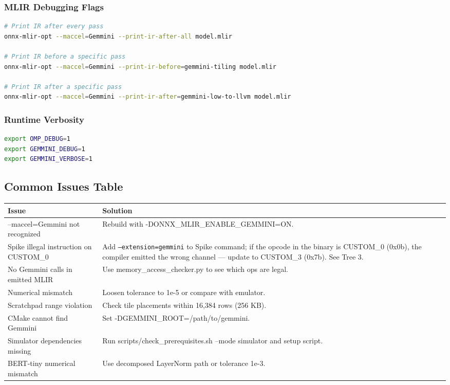 \documentclass[12pt,a4paper]{article}
\begin{document}
\subsubsection{MLIR Debugging Flags}

\begin{lstlisting}[language=bash]
# Print IR after every pass
onnx-mlir-opt --maccel=Gemmini --print-ir-after-all model.mlir

# Print IR before a specific pass
onnx-mlir-opt --maccel=Gemmini --print-ir-before=gemmini-tiling model.mlir

# Print IR after a specific pass
onnx-mlir-opt --maccel=Gemmini --print-ir-after=gemmini-low-to-llvm model.mlir
\end{lstlisting}

\subsubsection{Runtime Verbosity}

\begin{lstlisting}[language=bash]
export OMP_DEBUG=1
export GEMMINI_DEBUG=1
export GEMMINI_VERBOSE=1
\end{lstlisting}

\subsection{Common Issues Table}

\begin{longtable}{|p{}|p{}|}
\hline
\textbf{Issue} & \textbf{Solution} \\
\hline
--maccel=Gemmini not recognized & Rebuild with -DONNX\_MLIR\_ENABLE\_GEMMINI=ON. \\
\hline
Spike illegal instruction on CUSTOM\_0 & Add \texttt{--extension=gemmini} to Spike command; if the opcode in the binary is CUSTOM\_0 (0x0b), the compiler emitted the wrong channel --- update to CUSTOM\_3 (0x7b). See Tree 3. \\
\hline
No Gemmini calls in emitted MLIR & Use memory\_access\_checker.py to see which ops are legal. \\
\hline
Numerical mismatch & Loosen tolerance to 1e-5 or compare with emulator. \\
\hline
Scratchpad range violation & Check tile placements within 16,384 rows (256 KB). \\
\hline
CMake cannot find Gemmini & Set -DGEMMINI\_ROOT=/path/to/gemmini. \\
\hline
Simulator dependencies missing & Run scripts/check\_prerequisites.sh --mode simulator and setup script. \\
\hline
BERT-tiny numerical mismatch & Use decomposed LayerNorm path or tolerance 1e-3. \\
\hline
\end{longtable}
\end{document}
